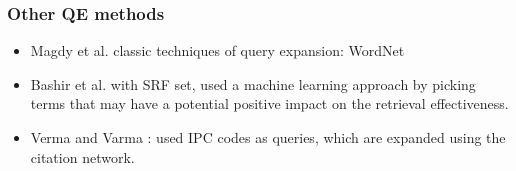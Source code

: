 \documentclass[xcolor=x11names,compress]{beamer}
\renewcommand{\(}{\begin{columns}}
\renewcommand{\)}{\end{columns}}
\newcommand{\<}[1]{\begin{column}{#1}}
\renewcommand{\>}{\end{column}}
\begin{document}
\begin{frame}
\frametitle{Other QE methods}

\begin{itemize}
\item Magdy et al. \citep{Magdy2011} classic techniques of query expansion: WordNet
\item Bashir et al. \citep{Bashir2010} with SRF set, used a machine learning approach by picking terms that may have a potential positive impact on the retrieval effectiveness. 


\item Verma and Varma \citep{Verma2011}: used IPC codes as queries, which are expanded using the citation network. 
\end{itemize}
\end{frame}
\end{document}
